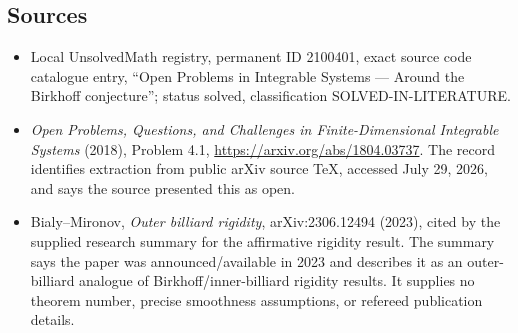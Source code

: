 \documentclass[11pt]{article}
\begin{document}
\subsection{Sources}
\begin{itemize}
\item Local UnsolvedMath registry, permanent ID 2100401, exact source code catalogue entry, ``Open Problems in Integrable Systems --- Around the Birkhoff conjecture''; status solved, classification SOLVED-IN-LITERATURE.
\item \emph{Open Problems, Questions, and Challenges in Finite-Dimensional Integrable Systems} (2018), Problem 4.1, \url{https://arxiv.org/abs/1804.03737}. The record identifies extraction from public arXiv source TeX, accessed July 29, 2026, and says the source presented this as open.
\item Bialy--Mironov, \emph{Outer billiard rigidity}, arXiv:2306.12494 (2023), cited by the supplied research summary for the affirmative rigidity result. The summary says the paper was announced/available in 2023 and describes it as an outer-billiard analogue of Birkhoff/inner-billiard rigidity results. It supplies no theorem number, precise smoothness assumptions, or refereed publication details.
\end{itemize}
\end{document}
